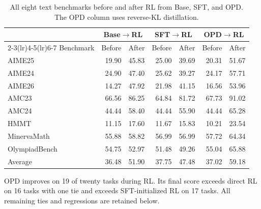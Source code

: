 \documentclass[]{jingdong}
\theoremstyle{plain}
\theoremstyle{definition}
\theoremstyle{remark}
\newcommand{\opdrl}{OPD$\rightarrow$RL}
\newcommand{\baserl}{Base$\rightarrow$RL}
\newcommand{\sftrl}{SFT$\rightarrow$RL}
\begin{document}
\begin{table}[H]
\centering
\small
\setlength{\tabcolsep}{3pt}
\renewcommand{\arraystretch}{1.05}
\caption{All eight text benchmarks before and after RL from Base, SFT, and OPD. The OPD column uses reverse-KL distillation.}
\label{tab:appendix-text-results}
\begin{tabular*}{\linewidth}{@{\extracolsep{\fill}}lrrrrrr@{}}
\toprule
& \multicolumn{2}{c}{\baserl{}} & \multicolumn{2}{c}{\sftrl{}} & \multicolumn{2}{c}{\opdrl{}} \\
\cmidrule(lr){2-3}\cmidrule(lr){4-5}\cmidrule(lr){6-7}
Benchmark & Before & After & Before & After & Before & After \\
\midrule
AIME25         & 19.90 & 45.83 & 25.00 & 39.69 & 20.31 & 51.67 \\
AIME24         & 24.90 & 47.40 & 25.62 & 39.27 & 24.17 & 57.71 \\
AIME26         & 14.27 & 47.92 & 21.98 & 41.15 & 16.56 & 53.96 \\
AMC23          & 66.56 & 86.25 & 64.84 & 81.72 & 67.73 & 91.02 \\
AMC24          & 44.44 & 58.40 & 44.44 & 55.90 & 44.44 & 65.28 \\
HMMT           & 11.15 & 17.60 & 11.67 & 15.83 & 10.21 & 23.54 \\
MinervaMath    & 55.88 & 58.82 & 56.99 & 56.99 & 57.72 & 64.34 \\
OlympiadBench  & 54.75 & 52.97 & 51.48 & 49.26 & 55.04 & 65.88 \\
\midrule
Average & 36.48 & 51.90 & 37.75 & 47.48 & 37.02 & 59.18 \\
\bottomrule
\end{tabular*}
\end{table}


OPD improves on 19 of twenty tasks during RL. Its final score exceeds direct RL on 16 tasks with one tie and exceeds SFT-initialized RL on 17 tasks. All remaining ties and regressions are retained below.
\end{document}

